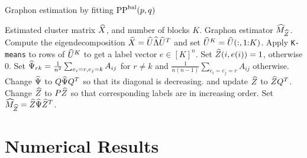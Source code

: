 %
%


\begin{algorithm}[t]%
\caption{Graphon estimation by fitting $\text{PP}^{\text{bal}}(p,q)$}
\label{alg:graphon}
{\small
\begin{algorithmic}[1]
   \Require Estimated cluster matrix $\widehat{X}$, and number of blocks $K$.
   \Ensure Graphon estimator $\widehat{M}_{\widehat{Z}}$.
   \State Compute the eigendecomposition  $\widehat{X} = \widehat{U} \widehat{\Lambda} \widehat{U}^T$ and
    set $\widehat{U}^{K} = \widehat{U}(:,\text{1:$K$})$.
    \State Apply \texttt{K-means} to rows of $\widehat{U}^K$ to get a label vector $e \in [K]^n$. 
      \quad Set $\widehat{Z}(i,e(i)) = 1$, otherwise 0.
   \State Set $\widehat{\Psi}_{rk} = \frac{1}{n^2} \sum_{e_i = r, e_j=k} {A_{ij}}$ for $r\neq k$ and 
   $\frac1{n(n-1)} \sum_{e_i=e_j=r} A_{ij}$ otherwise.
   \State Change $\widehat{\Psi}$ to $Q \widehat{\Psi} Q^T$ so that its diagonal is decreasing. 
    and update $\widehat{Z}$ to $\widehat{Z} Q^T$.
   \State Change $\widehat{Z} $ to $ P \widehat{Z}$ so that corresponding labels are in increasing order.
   \State Set $\widehat{M}_{\widehat{Z}} = \widehat{Z} \widehat{\Psi} \widehat{Z}^T$.
   
    
   
\end{algorithmic}
}
\end{algorithm}



\section{Numerical Results}\label{sec:numeric}\label{sec:numeric:res}


